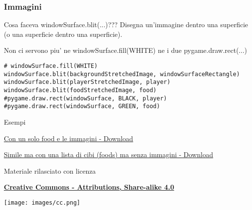 \documentclass{beamer}
\begin{document}
\begin{frame}[fragile]
\frametitle{Immagini}
    \begin{block}{Cosa faceva windowSurface.blit(...)???}
Disegna un'immagine dentro una superficie (o una superficie dentro una superficie).

Non ci servono piu' ne windowSurface.fill(WHITE) ne i due pygame.draw.rect(...)
    \end{block}
    
    \begin{lstlisting}
# windowSurface.fill(WHITE)
windowSurface.blit(backgroundStretchedImage, windowSurfaceRectangle)
windowSurface.blit(playerStretchedImage, player)
windowSurface.blit(foodStretchedImage, food)
#pygame.draw.rect(windowSurface, BLACK, player)
#pygame.draw.rect(windowSurface, GREEN, food)
\end{lstlisting}
\end{frame}

\begin{frame}{Esempi}
    \begin{center}
        \href{https://raw.githubusercontent.com/ragazzedigitalicesena/slide-2019/master/tex/chapter_19-20/collisionDetection_exercise.py}{Con un solo food e le immagini - Download}
        
        \href{https://raw.githubusercontent.com/ragazzedigitalicesena/slide-2019/master/tex/chapter_19-20/collisionDetection_example.py}{Simile ma con una lista di cibi (foods) ma senza immagini - Download}
    \end{center}
\end{frame}{}

\begin{frame}

\begin{center}
    \bigskip
    Materiale rilasciato con licenza
    
    \textbf{\href{http://creativecommons.org/licenses/by-sa/4.0/}{Creative Commons - Attributions, Share-alike 4.0}}
    
    \medskip
    \texttt{[image: images/cc.png]}
\end{center}

\end{frame}
\end{document}
